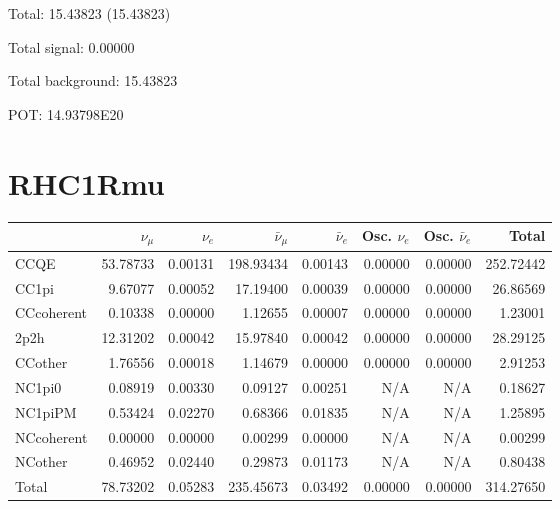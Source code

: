\documentclass[10pt,a4paper]{article}
\begin{document}
Total: 15.43823    (15.43823)


Total signal: 0.00000


Total background: 15.43823

POT: 14.93798E20



\clearpage


\section*{RHC1Rmu}
\begin{tabular} { | l ||r | r | r | r | r | r | | r | }
\hline
              & $\nu_\mu$            & $\nu_e$              & $\bar{\nu}_{\mu}$    & $\bar{\nu}_{e}$      & Osc. $\nu_e$         & Osc. $\bar{\nu}_{e}$ & Total                \\ \hline\hline
 CCQE         & 53.78733             & 0.00131              & 198.93434            & 0.00143              & 0.00000              & 0.00000              & 252.72442            \\ \hline
 CC1pi        & 9.67077              & 0.00052              & 17.19400             & 0.00039              & 0.00000              & 0.00000              & 26.86569             \\ \hline
 CCcoherent   & 0.10338              & 0.00000              & 1.12655              & 0.00007              & 0.00000              & 0.00000              & 1.23001              \\ \hline
 2p2h         & 12.31202             & 0.00042              & 15.97840             & 0.00042              & 0.00000              & 0.00000              & 28.29125             \\ \hline
 CCother      & 1.76556              & 0.00018              & 1.14679              & 0.00000              & 0.00000              & 0.00000              & 2.91253              \\ \hline
 NC1pi0       & 0.08919              & 0.00330              & 0.09127              & 0.00251              & N/A                  & N/A                  & 0.18627              \\ \hline
 NC1piPM      & 0.53424              & 0.02270              & 0.68366              & 0.01835              & N/A                  & N/A                  & 1.25895              \\ \hline
 NCcoherent   & 0.00000              & 0.00000              & 0.00299              & 0.00000              & N/A                  & N/A                  & 0.00299              \\ \hline
 NCother      & 0.46952              & 0.02440              & 0.29873              & 0.01173              & N/A                  & N/A                  & 0.80438              \\ \hline
\hline
 Total        & 78.73202             & 0.05283              & 235.45673            & 0.03492              & 0.00000              & 0.00000              & 314.27650            \\ \hline

\end{tabular}
\end{document}
